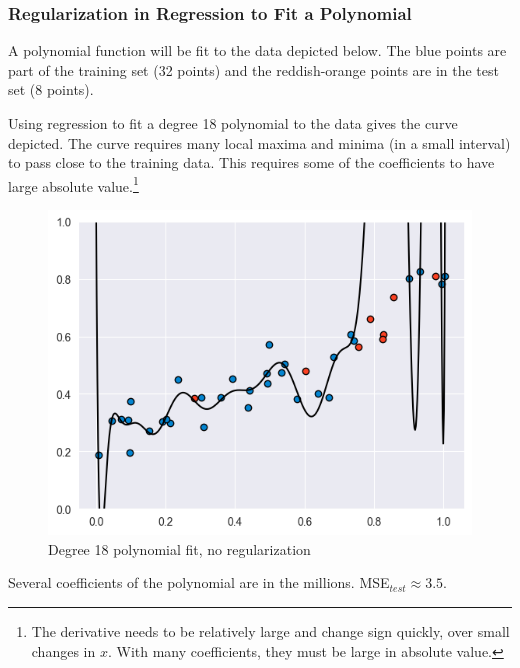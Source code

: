 \documentclass[smaller]{beamer}
\theoremstyle{example}
\begin{document}
\begin{frame}
    \frametitle{Regularization in Regression to Fit a Polynomial}
    \renewcommand\thefootnote{\textcolor{black}{\arabic{footnote}}}
    A polynomial function will be fit to the data depicted below. The blue points are part of the training set (32 points) and the reddish-orange points are in the test set (8 points).
    
    Using regression to fit a degree 18 polynomial to the data gives the curve depicted. The curve requires many local maxima and minima (in a small interval) to pass close to the training data. This requires some of the coefficients to have large absolute value.\footnote{The derivative needs to be relatively large and change sign quickly, over small changes in $x$. With many coefficients, they must be large in absolute value.}
    
    \begin{figure}
        \begin{center}
            \includegraphics[height=0.30\textheight]{../../Images/data_polynomial18_fit.png}
        \end{center}
        \caption{Degree 18 polynomial fit, no regularization}
    \end{figure}
    Several coefficients of the polynomial are in the millions. MSE$_{test}\approx 3.5$.
\end{frame}
\end{document}
